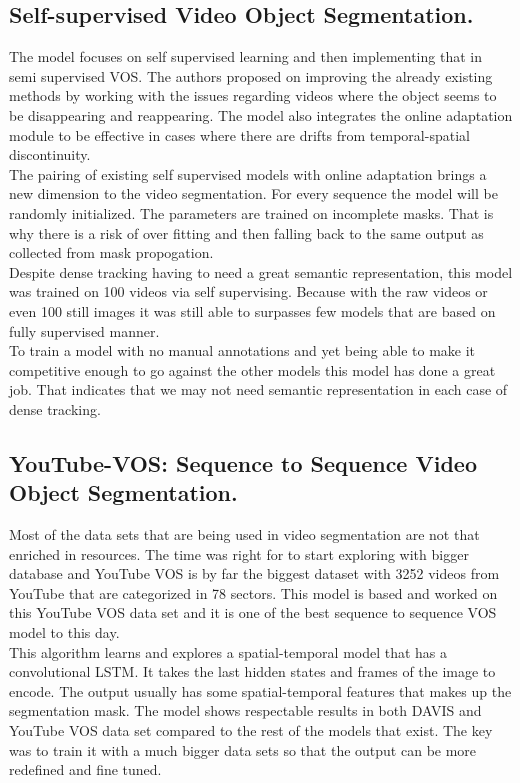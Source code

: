 \documentclass[conference]{IEEEtran}
\begin{document}
\subsection{Self-supervised Video Object Segmentation.} 
The model focuses on self supervised learning and then implementing that in semi supervised VOS. The authors\cite{zhu2020self} proposed on improving the already existing methods by working with the issues regarding videos where the object seems to be disappearing and reappearing. The model also integrates the online adaptation module to be effective in cases where there are drifts from temporal-spatial discontinuity.\\
The pairing of existing self supervised models with online adaptation brings a new dimension to the video segmentation. For every sequence the model will be randomly initialized. The parameters are trained on incomplete masks. That is why there is a risk of over fitting and then falling back to the same output as collected from mask propogation. \\
Despite dense tracking having to need a great semantic representation, this model was trained on 100 videos via self supervising. Because with the raw videos or even 100 still images it was still able to surpasses few models that are based on fully supervised manner.\\
To train a model with no manual annotations and yet being able to make it competitive enough to go against the other models this model has done a great job. That indicates that we may not need semantic representation in each case of dense tracking.



\subsection{YouTube-VOS: Sequence to Sequence Video Object Segmentation.} Most of the data sets that are being used in video segmentation are not that enriched in resources. The time was right for to start exploring with bigger database and YouTube VOS\cite{Xu_2018_ECCV} is by far the biggest dataset with 3252 videos from YouTube that are categorized in 78 sectors. This model is based and worked on this YouTube VOS data set and it is one of the best sequence to sequence VOS model to this day.\\
This algorithm learns and explores a spatial-temporal model that has a convolutional LSTM. It takes the last hidden states and frames of the image to encode. The output usually has some spatial-temporal features that makes up the segmentation mask. 
The model shows respectable results in both DAVIS and YouTube VOS data set compared to the rest of the models that exist. The key was to train it with a much bigger data sets so that the output can be more redefined and fine tuned. 
\end{document}
